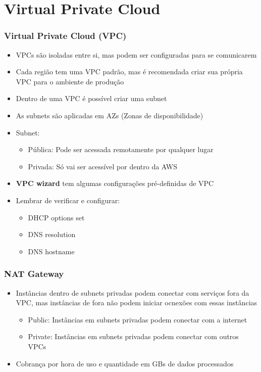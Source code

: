 \section{Virtual Private Cloud}

\begin{frame}
	\frametitle{Virtual Private Cloud (VPC)}
	\begin{itemize}
		\item VPCs são isoladas entre si, mas podem ser configuradas para se comunicarem
		\item Cada região tem uma VPC padrão, mas é recomendada criar sua própria VPC para o ambiente de produção
		\item Dentro de uma VPC é possível criar uma subnet
		\item As subnets são aplicadas em AZs (Zonas de disponibilidade)
		\item Subnet:
			\begin{itemize}
				\item Pública: Pode ser acessada remotamente por qualquer lugar
				\item Privada: Só vai ser acessível por dentro da AWS
			\end{itemize}
		\item \textbf{VPC wizard} tem algumas configurações pré-definidas de VPC
		\item Lembrar de verificar e configurar:
		\begin{itemize}
			\item DHCP options set
			\item DNS resolution
			\item DNS hostname
		\end{itemize}
	\end{itemize}
\end{frame}

\begin{frame}
	\frametitle{NAT Gateway}
	\begin{itemize}
		\item Instâncias dentro de subnets privadas podem conectar com serviços fora da VPC, mas instâncias de fora não podem iniciar ocnexões com essas instâncias
			\begin{itemize}
				\item Public: Instâncias em subnets privadas podem conectar com a internet
				\item Private: Instâncias em subnets privadas podem conectar com outros VPCs
			\end{itemize}
		\item Cobrança por hora de uso e quantidade em GBs de dados processados
	\end{itemize}
\end{frame}


